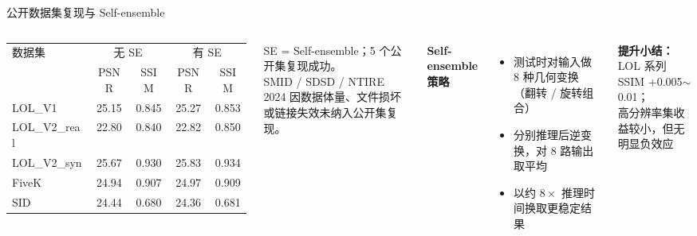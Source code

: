\documentclass[aspectratio=169,10pt]{beamer}
\begin{document}
\begin{frame}{公开数据集复现与 Self-ensemble}
  \begin{columns}[T]
    \scriptsize
    \renewcommand{\arraystretch}{1.15}
    \begin{tabular}{lcccc}
      \toprule
      \multirow{2}{*}{数据集} & \multicolumn{2}{c}{无 SE} & \multicolumn{2}{c}{有 SE} \\
      \cmidrule(lr){2-3}\cmidrule(lr){4-5}
      & PSNR & SSIM & PSNR & SSIM \\
      \midrule
      LOL\_V1      & 25.15 & 0.845 & 25.27 & 0.853 \\
      LOL\_V2\_real & 22.80 & 0.840 & 22.82 & 0.850 \\
      LOL\_V2\_syn  & 25.67 & 0.930 & 25.83 & 0.934 \\
      FiveK        & 24.94 & 0.907 & 24.97 & 0.909 \\
      SID          & 24.44 & 0.680 & 24.36 & 0.681 \\
      \bottomrule
    \end{tabular}
    \tiny SE = Self-ensemble；5 个公开集复现成功。\\
    SMID / SDSD / NTIRE 2024 因数据体量、文件损坏或链接失效未纳入公开集复现。

    \small
    \textbf{Self-ensemble 策略}
    \begin{itemize}
      \item 测试时对输入做 8 种几何变换（翻转 / 旋转组合）
      \item 分别推理后逆变换，对 8 路输出取平均
      \item 以约 $8\times$ 推理时间换取更稳定结果
    \end{itemize}
    \vspace{0.3em}
    \scriptsize
    \textbf{提升小结：}LOL 系列 SSIM +0.005$\sim$0.01；\\
    高分辨率集收益较小，但无明显负效应
  \end{columns}
\end{frame}
\end{document}
